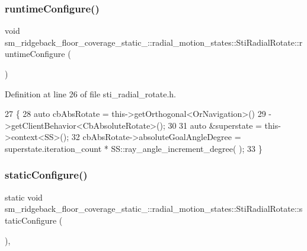 \subsubsection{\texorpdfstring{runtime\+Configure()}{runtimeConfigure()}}
{\footnotesize\ttfamily void sm\+\_\+ridgeback\+\_\+floor\+\_\+coverage\+\_\+static\+\_\+::radial\+\_\+motion\+\_\+states\+::\+Sti\+Radial\+Rotate\+::runtime\+Configure (\begin{DoxyParamCaption}{ }\end{DoxyParamCaption})\hspace{0.3cm}{\ttfamily [inline]}}



Definition at line 26 of file sti\+\_\+radial\+\_\+rotate.\+h.


\begin{DoxyCode}
27       \{
28         \textcolor{keyword}{auto} cbAbsRotate = this->getOrthogonal<OrNavigation>()
29                                ->getClientBehavior<CbAbsoluteRotate>();
30 
31         \textcolor{keyword}{auto} &superstate = this->context<SS>();
32         cbAbsRotate->absoluteGoalAngleDegree = superstate.iteration\_count * SS::ray\_angle\_increment\_degree(
      );
33       \}
\end{DoxyCode}
\mbox{\label{structsm__ridgeback__floor__coverage__static__1_1_1radial__motion__states_1_1StiRadialRotate_a1bd122455e013733e5eed1831b544428}} 
\subsubsection{\texorpdfstring{static\+Configure()}{staticConfigure()}}
{\footnotesize\ttfamily static void sm\+\_\+ridgeback\+\_\+floor\+\_\+coverage\+\_\+static\+\_\+::radial\+\_\+motion\+\_\+states\+::\+Sti\+Radial\+Rotate\+::static\+Configure (\begin{DoxyParamCaption}{ }\end{DoxyParamCaption})\hspace{0.3cm}{\ttfamily [inline]}, {\ttfamily [static]}}



